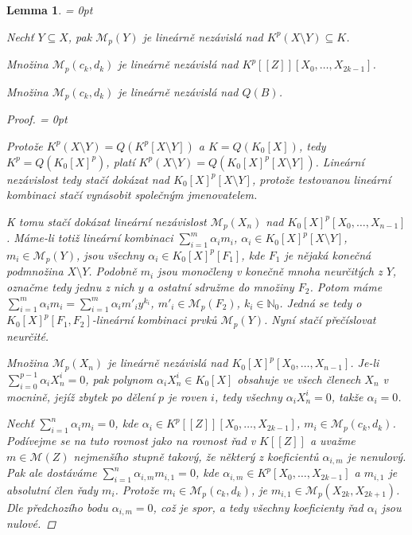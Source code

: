 \documentclass[11pt,a4paper]{article}
\newcommand\m[1]{\mathbb { #1 }} %
\newcommand\p[1]{\mathcal{ #1 }} %
\newcommand\N{\m N}
\newenvironment{items}{%
	\itemize
	\itemsep = 0pt%
}{%
	\enditemize
}
\newcounter{numb}
\theoremstyle{definition}
\theoremstyle{plain}
\newtheorem{lemma}[numb]{Lemma}
\begin{document}
\begin{lemma} \label{thm:lin_indep} \hfill
	\begin{items}
		\item Nechť $Y \subseteq X$, pak $\p M_p(Y)$ je lineárně nezávislá nad $K^p(X \setminus Y) \subseteq K$.
		\item	Množina $\p M_p(c_k, d_k)$ je lineárně nezávislá nad $K^p[[Z]][X_0, \hdots, X_{2k - 1}]$.
		\item Množina $\p M_p(c_k, d_k)$ je lineárně nezávislá nad $Q(B)$. 
	\end{items}
	
	\begin{proof} \hfill
		\begin{items}
			\newcommand*{\I}{_{i = 1}^m}

			\item Protože $K^p(X \setminus Y) = Q(K^p[X \setminus Y])$ a $K = Q(K_0[X])$, tedy $K^p = Q(K_0[X]^p)$, platí $K^p(X \setminus Y) = Q(K_0[X]^p[X \setminus Y])$. Lineární nezávislost tedy stačí dokázat nad $K_0[X]^p[X \setminus Y]$, protože testovanou lineární kombinaci stačí vynásobit společným jmenovatelem.

			K tomu stačí dokázat lineární nezávislost $\p M_p(X_n)$ nad $K_0[X]^p[X_0, \hdots, X_{n - 1}]$. Máme-li totiž lineární kombinaci $\sum\I \alpha_i m_i$, $\alpha_i \in K_0[X]^p[X \setminus Y]$, $m_i \in \p M_p(Y)$, jsou všechny $\alpha_i \in K_0[X]^p[F_1]$, kde $F_1$ je nějaká konečná podmnožina $X \setminus Y$. Podobně $m_i$ jsou monočleny v konečně mnoha neurčitých z $Y$, označme tedy jednu z nich $y$ a ostatní sdružme do množiny $F_2$. Potom máme $\sum\I \alpha_i m_i = \sum\I \alpha_i m'_i y^{k_i}$, $m'_i \in \p M_p(F_2)$, $k_i \in \N_0$. Jedná se tedy o $K_0[X]^p[F_1, F_2]$-lineární kombinaci prvků $\p M_p(Y)$. Nyní stačí přečíslovat neurčité.

			Množina $\p M_p(X_n)$ je lineárně nezávislá nad $K_0[X]^p[X_0, \hdots, X_{n - 1}]$. Je-li $\sum_{i = 0}^{p - 1} \alpha_i X_n^i = 0$, pak polynom $\alpha_i X_n^i \in K_0[X]$ obsahuje ve všech členech $X_n$ v mocnině, jejíž zbytek po dělení $p$ je roven $i$, tedy všechny $\alpha_i X_n^i = 0$, takže $\alpha_i = 0$.

			\item Nechť $\sum_{i = 1}^n \alpha_i m_i = 0$, kde $\alpha_i \in K^p[[Z]][X_0, \hdots, X_{2k - 1}]$, $m_i \in \p M_p(c_k, d_k)$. Podívejme se na tuto rovnost jako na rovnost řad v $K[[Z]]$ a uvažme $m \in \p M(Z)$ nejmenšího stupně takový, že některý z koeficientů $\alpha_{i, m}$ je nenulový. Pak ale dostáváme $\sum_{i = 1}^n \alpha_{i, m} m_{i, 1} = 0$, kde $\alpha_{i, m} \in K^p[X_0, \hdots, X_{2k - 1}]$ a $m_{i, 1}$ je absolutní člen řady $m_i$. Protože $m_i \in \p M_p(c_k, d_k)$, je $m_{i, 1} \in \p M_p(X_{2k}, X_{2k + 1})$. Dle předchozího bodu $\alpha_{i, m} = 0$, což je spor, a tedy všechny koeficienty řad $\alpha_i$ jsou nulové.


\end{items}
\end{proof}
\end{lemma}
\end{document}
